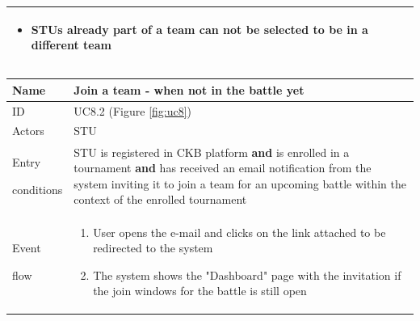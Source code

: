 \begin{center}
\begin{tabular}{| m{2cm} | m{10cm}|}
\begin{itemize}
                                    \item STUs already part of a team can not be selected to be in a different team
                                \end{itemize}                                                                                                                                                                                                                                                                                       \\ \hline
    \end{tabular}
\end{center}

\begin{center}
    \def\arraystretch{1.5}
    \begin{tabular}{| m{2cm} | m{10cm}|}
        \hline
        Name                  & Join a team - when not in the battle yet                                                                                                                                                                                                        \\ \hline
        ID                    & UC8.2 (Figure \ref{fig:uc8})                                                                                                                                                                                                                    \\ \hline
        Actors                & STU                                                                                                                                                                                                                                             \\ \hline
        Entry \par conditions & STU is registered in CKB platform \textbf{and} is enrolled in a tournament \textbf{and} has received an email notification from the system inviting it to join a team for an upcoming battle within the context of the enrolled tournament      \\ \hline
        Event \par flow       & \begin{enumerate}
                                    \item User opens the e-mail and clicks on the link attached to be redirected to the system
                                    \item The system shows the "Dashboard" page with the invitation if the join windows for the battle is still open

\end{enumerate}
\end{tabular}
\end{center}
